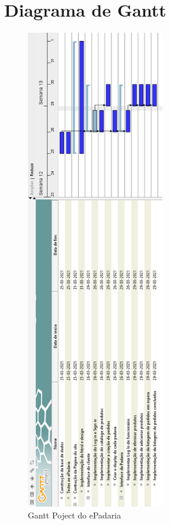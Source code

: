 \section {Diagrama de Gantt}
\begin{figure}[H]
	\centering
	\includegraphics[width=6cm]{gantt}
	\caption{Gantt Poject do ePadaria}
	\label{fig:gantt}
\end{figure}




